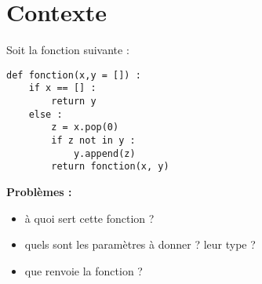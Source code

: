 \def\xxactivite{Cours}

\def\xxauteur{Xavier Pessoles}
\fichefalse \proftrue \tdfalse \courstrue

\def\xxnumchapitre{Chapitre 6 \vspace{.2cm}}
\def\xxchapitre{\hspace{.12cm} Méthode de programmation}

\def\xxcompetences{%
\textsl{%
\textbf{Savoirs et compétences :}\\
\begin{itemize}[label=\ding{112},font=\color{bleuxp}] 
\item Spécifications des données attentdues en entrée et fournie en sortie/retour.
\item Annotation d'un bloc d'instructions par une précondition, une postcondition, une propriété invariante
\item Assertion.
\item Jeu de tests associé à un programme.
\end{itemize}
}}

\def\xxfigures{
}%


\setlength{\columnseprule}{.1pt}

\vspace{2cm}
\pagestyle{fancy}
\thispagestyle{plain}




\section{Contexte}
Soit la fonction suivante : 
\begin{lstlisting}
def fonction(x,y = []) :
    if x == [] : 
        return y
    else : 
        z = x.pop(0)
        if z not in y : 
            y.append(z)
        return fonction(x, y)
\end{lstlisting}

\textbf{Problèmes :}
\begin{itemize}
\item à quoi sert cette fonction ?
\item quels sont les paramètres à donner ? leur type ?
\item que renvoie la fonction ?
\end{itemize}

